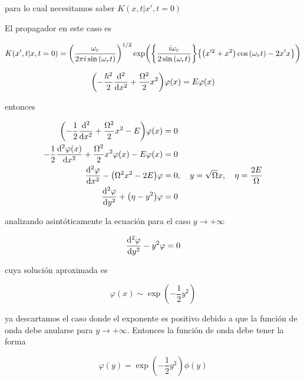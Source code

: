 \documentclass[../Main.tex]{subfiles}
\begin{document}
para lo cual necesitamos saber $K(x,t|x',t=0)$ %

El propagador en este caso es

\begin{equation}
K(x',t|x,t=0)=\pqty{\dfrac{\omega_r}{2\pi i \sin\pqty{\omega_r t}} }^{1/2}\exp(\Bqty{\dfrac{i\omega_r}{2\sin\pqty{\omega_r t}}}\Bqty{\pqty{x'^2+x^2}\cos\pqty{\omega_r t}-2x'x})
\end{equation}

\begin{equation}
\pqty{-\frac{\hbar^2}{2}\dv[2]{x} + \frac{\Omega^2}{2} x^2}\varphi(x)=E\varphi(x)
\end{equation}

entonces

\begin{equation}
\begin{split}
\pqty{-\frac{1}{2}\dv[2]{x} + \frac{\Omega^2}{2} x^2-E}\varphi(x) & = 0\\
-\frac{1}{2}\dv[2]{\varphi(x)}{x} + \frac{\Omega^2}{2} x^2\varphi(x) -E\varphi(x) & = 0 \\
\dv[2]{\varphi}{x} - \pqty{\Omega^2 x^2-2E}\varphi & = 0 \qc y=\sqrt{\Omega}x\qc \eta=\dfrac{2E}{\Omega}\\
\dv[2]{\varphi}{y} + \pqty{\eta-y^2}\varphi & = 0
\end{split}
\label{edoprin}
\end{equation}

analizando asintóticamente la ecuación para el caso $y\rightarrow+\infty$

\begin{equation}
\dv[2]{\varphi}{y} - y^2\varphi = 0
\end{equation}

cuya solución aproximada es

\begin{equation}
\varphi(x)\sim\exp(-\dfrac{1}{2}y^2)
\end{equation}

ya descartamos el caso donde el exponente es positivo debido a que la función de onda debe anularse para $y\rightarrow+\infty$. Entonces la función de onda debe tener la forma

\begin{equation}
\varphi(y)=\exp(-\dfrac{1}{2}y^2)\phi(y)
\end{equation}
\end{document}
